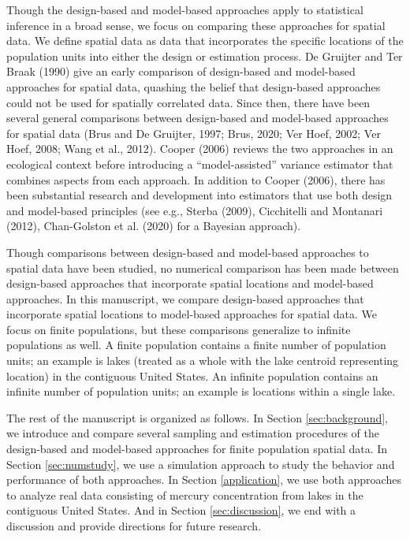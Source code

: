 \documentclass[]{elsarticle} %
\begin{document}
Though the design-based and model-based approaches apply to statistical
inference in a broad sense, we focus on comparing these approaches for
spatial data. We define spatial data as data that incorporates the
specific locations of the population units into either the design or
estimation process. De Gruijter and Ter Braak (1990) give an early
comparison of design-based and model-based approaches for spatial data,
quashing the belief that design-based approaches could not be used for
spatially correlated data. Since then, there have been several general
comparisons between design-based and model-based approaches for spatial
data (Brus and De Gruijter, 1997; Brus, 2020; Ver Hoef, 2002; Ver Hoef,
2008; Wang et al., 2012). Cooper (2006) reviews the two approaches in an
ecological context before introducing a ``model-assisted'' variance
estimator that combines aspects from each approach. In addition to
Cooper (2006), there has been substantial research and development into
estimators that use both design and model-based principles (see e.g.,
Sterba (2009), Cicchitelli and Montanari (2012), Chan-Golston et al.
(2020) for a Bayesian approach).

Though comparisons between design-based and model-based approaches to
spatial data have been studied, no numerical comparison has been made
between design-based approaches that incorporate spatial locations and
model-based approaches. In this manuscript, we compare design-based
approaches that incorporate spatial locations to model-based approaches
for spatial data. We focus on finite populations, but these comparisons
generalize to infinite populations as well. A finite population contains
a finite number of population units; an example is lakes (treated as a
whole with the lake centroid representing location) in the contiguous
United States. An infinite population contains an infinite number of
population units; an example is locations within a single lake.

The rest of the manuscript is organized as follows. In Section
\ref{sec:background}, we introduce and compare several sampling and
estimation procedures of the design-based and model-based approaches for
finite population spatial data. In Section \ref{sec:numstudy}, we use a
simulation approach to study the behavior and performance of both
approaches. In Section \ref{application}, we use both approaches to
analyze real data consisting of mercury concentration from lakes in the
contiguous United States. And in Section \ref{sec:discussion}, we end
with a discussion and provide directions for future research.
\end{document}
